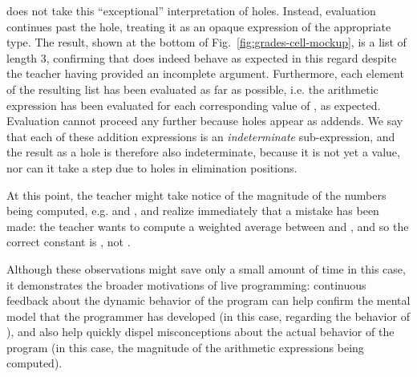 \Hazel{} does not take this ``exceptional'' interpretation of holes. Instead, evaluation continues past the hole, treating it as an opaque expression of the appropriate type. The result, shown at the bottom of Fig.~\ref{fig:grades-cell-mockup}, is a list of length $3$, confirming that  does indeed behave as expected in this regard despite the teacher having provided an incomplete argument. Furthermore, each element of the resulting list has been evaluated as far as possible, i.e. the arithmetic expression  has been evaluated for each corresponding value of , as expected. Evaluation cannot proceed any further because holes appear as addends. We say that each of these addition expressions is an \emph{indeterminate} sub-expression, and the result as a hole is therefore also indeterminate, because it is not yet a value, nor can it take a step due to holes in elimination positions.

At this point, the teacher might take notice of the magnitude of the numbers being computed, e.g.  and , and
realize immediately that a mistake has been made: the teacher wants to compute a 
weighted average between  and , and so the correct
constant is , not . %

Although these observations might 
save only a small amount of time in this case, 
it demonstrates
the broader motivations of live programming: continuous feedback about the dynamic behavior of the 
program can help confirm the mental model 
that the programmer has developed (in this case, regarding the behavior of ), and also help quickly dispel 
misconceptions about the 
actual behavior of the program (in this case, the magnitude of the arithmetic expressions being computed).

